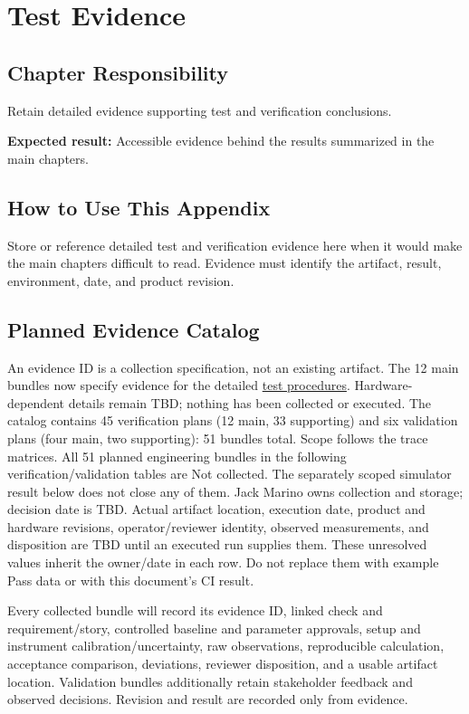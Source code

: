 \chapter{Test Evidence}
\section{Chapter Responsibility}
\label{Section:TestEvidenceResponsibility}
Retain detailed evidence supporting test and verification conclusions.

\noindent\textbf{Expected result:} Accessible evidence behind the results summarized in the main chapters.

\section{How to Use This Appendix}
Store or reference detailed test and verification evidence here when it would make the main chapters difficult to read. Evidence must identify the artifact, result, environment, date, and product revision.
\section{Planned Evidence Catalog}
\label{Section:PlannedEvidence}
An evidence ID is a collection specification, not an existing artifact. The 12 main bundles now specify evidence for the detailed \hyperref[Section:MainTestProcedures]{test procedures}. Hardware-dependent details remain TBD; nothing has been collected or executed.
The catalog contains 45 verification plans (12 main, 33 supporting) and six validation plans (four main, two supporting): 51 bundles total. Scope follows the trace matrices. All 51 planned engineering bundles in the following verification/validation tables are Not collected. The separately scoped simulator result below does not close any of them. Jack Marino owns collection and storage;
decision date is TBD. Actual artifact location, execution date, product and
hardware revisions, operator/reviewer identity, observed measurements, and
disposition are TBD until an executed run supplies them. These unresolved
values inherit the owner/date in each row. Do not replace them with example
Pass data or with this document's CI result.

Every collected bundle will record its evidence ID, linked check and
requirement/story, controlled baseline and parameter approvals, setup and
instrument calibration/uncertainty, raw observations, reproducible calculation,
acceptance comparison, deviations, reviewer disposition, and a usable artifact
location. Validation bundles additionally retain stakeholder feedback and
observed decisions. Revision and result are recorded only from evidence.

